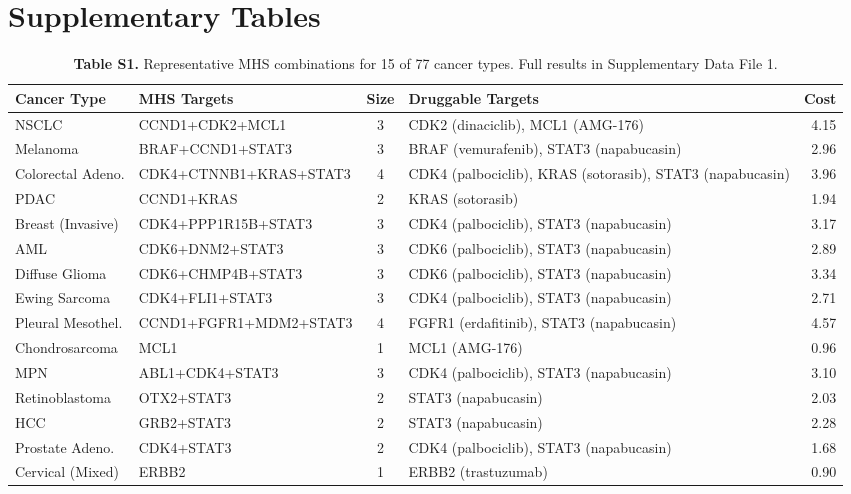 \documentclass[11pt]{article}
\begin{document}

\section{Supplementary Tables}

\begin{table}[htbp]
\centering
\caption{\textbf{Table S1.} Representative MHS combinations for 15 of 77 cancer types. Full results in Supplementary Data File 1.}
\scriptsize
\setlength{\tabcolsep}{4pt}
\begin{tabular}{@{}p{2.8cm}lcp{5.8cm}r@{}}
\toprule
\textbf{Cancer Type} & \textbf{MHS Targets} & \textbf{Size} & \textbf{Druggable Targets} & \textbf{Cost} \\
\midrule
NSCLC & CCND1+CDK2+MCL1 & 3 & CDK2 (dinaciclib), MCL1 (AMG-176) & 4.15 \\
Melanoma & BRAF+CCND1+STAT3 & 3 & BRAF (vemurafenib), STAT3 (napabucasin) & 2.96 \\
Colorectal Adeno. & CDK4+CTNNB1+KRAS+STAT3 & 4 & CDK4 (palbociclib), KRAS (sotorasib), STAT3 (napabucasin) & 3.96 \\
PDAC & CCND1+KRAS & 2 & KRAS (sotorasib) & 1.94 \\
Breast (Invasive) & CDK4+PPP1R15B+STAT3 & 3 & CDK4 (palbociclib), STAT3 (napabucasin) & 3.17 \\
AML & CDK6+DNM2+STAT3 & 3 & CDK6 (palbociclib), STAT3 (napabucasin) & 2.89 \\
Diffuse Glioma & CDK6+CHMP4B+STAT3 & 3 & CDK6 (palbociclib), STAT3 (napabucasin) & 3.34 \\
Ewing Sarcoma & CDK4+FLI1+STAT3 & 3 & CDK4 (palbociclib), STAT3 (napabucasin) & 2.71 \\
Pleural Mesothel. & CCND1+FGFR1+MDM2+STAT3 & 4 & FGFR1 (erdafitinib), STAT3 (napabucasin) & 4.57 \\
Chondrosarcoma & MCL1 & 1 & MCL1 (AMG-176) & 0.96 \\
MPN & ABL1+CDK4+STAT3 & 3 & CDK4 (palbociclib), STAT3 (napabucasin) & 3.10 \\
Retinoblastoma & OTX2+STAT3 & 2 & STAT3 (napabucasin) & 2.03 \\
HCC & GRB2+STAT3 & 2 & STAT3 (napabucasin) & 2.28 \\
Prostate Adeno. & CDK4+STAT3 & 2 & CDK4 (palbociclib), STAT3 (napabucasin) & 1.68 \\
Cervical (Mixed) & ERBB2 & 1 & ERBB2 (trastuzumab) & 0.90 \\
\bottomrule
\end{tabular}
\normalsize
\end{table}
\end{document}
